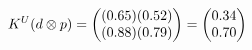 \documentclass[preview]{standalone}
\begin{document}
\begin{align*}
\special{dvisvgm:raw <g id='unique000'>}K^U(d \otimes p) = \begin{pmatrix} (0.65)(0.52) \\ (0.88)(0.79) \end{pmatrix} = \begin{pmatrix} 0.34 \\ 0.70 \end{pmatrix}\special{dvisvgm:raw </g>}
\end{align*}
\end{document}
